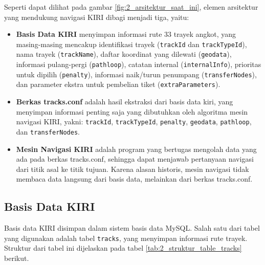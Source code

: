 Seperti dapat dilihat pada gambar \ref{fig:2_arsitektur_saat_ini}, elemen
arsitektur yang mendukung navigasi KIRI dibagi menjadi tiga, yaitu:
\begin{itemize}
	\item \textbf{Basis Data KIRI} menyimpan informasi rute 33 trayek angkot,
		yang masing-masing mencakup identifikasi trayek (\verb/trackId/ dan
		\verb/trackTypeId/), nama trayek (\verb/trackName/), daftar koordinat
		yang dilewati (\verb/geodata/), informasi pulang-pergi
		(\verb/pathloop/), catatan internal (\verb/internalInfo/), prioritas
		untuk dipilih (\verb/penalty/), informasi naik/turun penumpang
		(\verb/transferNodes/), dan parameter ekstra untuk pembelian
		tiket (\verb/extraParameters/).
	\item \textbf{Berkas tracks.conf} adalah hasil ekstraksi dari basis data
		kiri, yang menyimpan informasi penting saja yang dibutuhkan oleh algoritma
		mesin navigasi KIRI, yakni: \verb/trackId/, \verb/trackTypeId/,
		\verb/penalty/, \verb/geodata/, \verb/pathloop/, dan
		\verb/transferNodes/.
	\item \textbf{Mesin Navigasi KIRI} adalah program yang bertugas mengolah
		data yang ada pada berkas tracks.conf, sehingga dapat menjawab
		pertanyaan navigasi dari titik asal ke titik tujuan. Karena alasan
		historis, mesin navigasi tidak membaca data langsung dari basis data,
		melainkan dari berkas tracks.conf.
\end{itemize}

\subsection{Basis Data KIRI}
Basis data KIRI disimpan dalam sistem basis data MySQL. Salah satu dari
tabel yang digunakan adalah tabel \verb/tracks/, yang menyimpan informasi
rute trayek. Struktur dari tabel ini dijelaskan pada tabel
\ref{tab:2_struktur_table_tracks} berikut.

